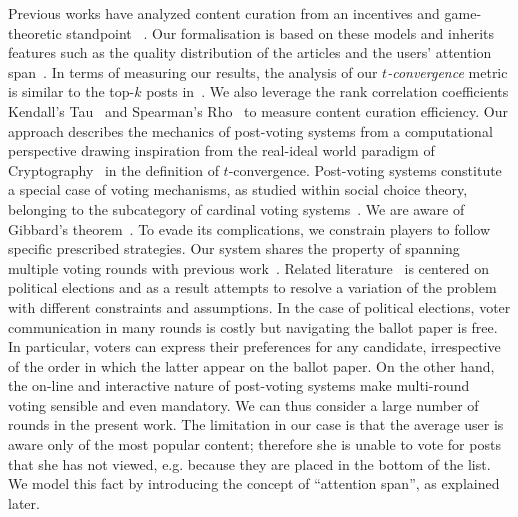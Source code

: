 Previous works have analyzed content curation from an incentives and game-theoretic standpoint~\cite{ghosh2011incentivizing,das2010ranking,gupte2009news,may2014filter,abbassi2014distributed} . Our formalisation is based on these models and inherits features such as the quality distribution of the articles and the users' attention span~\cite{askalidis2013theoretical,ghosh2011incentivizing}. In terms of measuring our results, the analysis of our \textit{$t$-convergence} metric is similar to the top-$k$ posts in~\cite{askalidis2013theoretical}. We also leverage the rank correlation coefficients Kendall's Tau~\cite{kendall1955rank} and Spearman's Rho~\cite{spearman1904proof} to measure content curation efficiency. 
Our approach describes the mechanics of post-voting systems from a computational perspective drawing inspiration from the real-ideal world paradigm of Cryptography~\cite{goldreich1999foundations,lindell} in the definition of $t$-convergence.
Post-voting systems constitute a special case of voting mechanisms, as studied within social choice theory, belonging to the subcategory of cardinal voting systems~\cite{hillinger2005case}. We are aware of Gibbard's theorem~\cite{gibbard1973manipulation}. To evade its complications, we constrain players to follow specific prescribed strategies. Our system shares the property of spanning multiple voting rounds with previous work~\cite{kalech2011practical}. Related literature~\cite{lu2011robust,conitzer2005communication,xia2010compilation} is centered on political elections and as a result attempts to resolve a variation of the problem with different constraints and assumptions. In the case of political elections, voter communication in many rounds is costly but navigating the ballot paper is free. In particular, voters can express their preferences for any candidate, irrespective of the order in which the latter appear on the ballot paper. On the other hand, the on-line and interactive nature of post-voting systems make multi-round voting sensible and even mandatory. We can thus consider a large number of rounds in the present work. The limitation in our case is that the average user is aware only of the most popular content; therefore she is unable to vote for posts that she has not viewed, e.g. because they are placed in the bottom of the list. We model this fact by introducing the concept of ``attention span'', as explained later.


